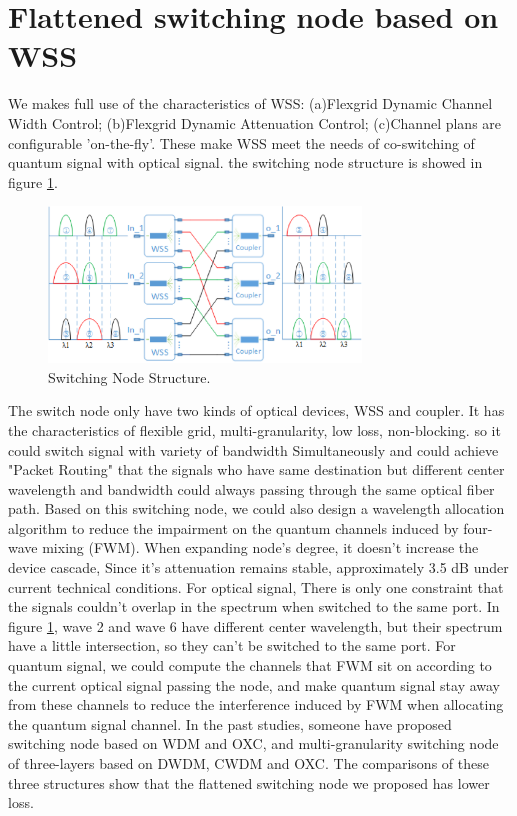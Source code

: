 \documentclass[letterpaper,10pt]{article}
\begin{document}
\section{Flattened switching node based on WSS}
We makes full use of the characteristics of WSS: (a)Flexgrid Dynamic Channel Width Control; (b)Flexgrid Dynamic Attenuation Control; (c)Channel plans are configurable 'on-the-fly'. These make WSS meet the needs of co-switching of quantum signal with optical signal. the switching node structure is showed in figure \ref{fig:switching_node_structure}.
\begin{figure}[htbp]
  \centering
  \includegraphics[width=8.3cm]{swtiching_node_struct}
  \caption{Switching Node Structure.} \label{fig:switching_node_structure}
\end{figure}
The switch node only have two kinds of optical devices, WSS and coupler. It has the characteristics of flexible grid, multi-granularity, low loss, non-blocking. so it could switch signal with variety of bandwidth Simultaneously and could achieve "Packet Routing" that the signals who have same destination but different center wavelength and bandwidth could always passing through the same optical fiber path. Based on this switching node, we could also design a wavelength allocation algorithm to reduce the impairment on the quantum channels induced by four-wave mixing (FWM). When expanding node's degree, it doesn't increase the device cascade, Since it's attenuation remains stable, approximately 3.5 dB under current technical conditions.
For optical signal, There is only one constraint that the signals couldn't overlap in the spectrum when switched to the same port. In figure \ref{fig:switching_node_structure}, wave 2 and wave 6 have different center wavelength, but their spectrum have a little intersection, so they can't be switched to the same port. For quantum signal, we could compute the channels that FWM sit on according to the current optical signal passing the node, and make quantum signal stay away from these channels to reduce the interference induced by FWM when allocating the quantum signal channel. In the past studies, someone have proposed switching node based on WDM and OXC, and multi-granularity switching node of three-layers based on DWDM, CWDM and OXC. The comparisons of these three structures show that the flattened switching node we proposed has lower loss.
\end{document}
